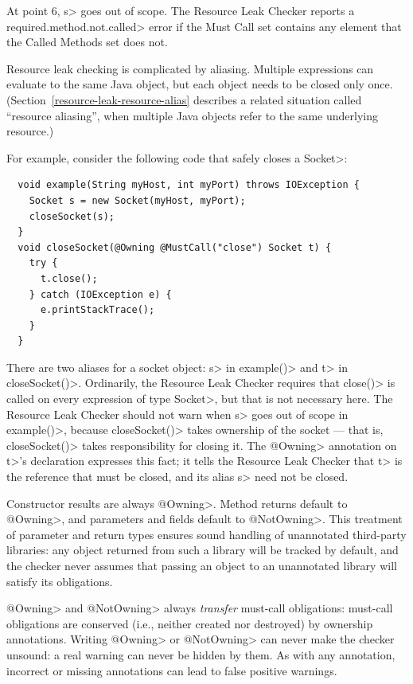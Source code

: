 At point 6, \<s> goes out of scope.  The Resource Leak Checker reports a
\<required.method.not.called> error if the Must Call set contains any
element that the Called Methods set does not.



Resource leak checking is complicated by aliasing.  Multiple expressions
can evaluate to the same Java object, but each object needs to be
closed only once.  (Section~\ref{resource-leak-resource-alias} describes a
related situation called ``resource aliasing'', when multiple Java objects
refer to the same underlying resource.)

For example, consider the following code that safely closes a \<Socket>:

\begin{verbatim}
  void example(String myHost, int myPort) throws IOException {
    Socket s = new Socket(myHost, myPort);
    closeSocket(s);
  }
  void closeSocket(@Owning @MustCall("close") Socket t) {
    try {
      t.close();
    } catch (IOException e) {
      e.printStackTrace();
    }
  }
\end{verbatim}

There are two aliases for a socket object: \<s> in \<example()> and \<t> in
\<closeSocket()>.  Ordinarily, the Resource Leak Checker requires that
\<close()> is called on every expression of type \<Socket>, but that is not
necessary here.  The Resource Leak Checker should not warn when
\<s> goes out of scope in \<example()>, because \<closeSocket()> takes ownership
of the socket --- that is, \<closeSocket()> takes responsibility for closing
it. The \<@Owning> annotation on \<t>'s declaration expresses this fact; it
tells the Resource Leak Checker that \<t> is the reference that must be
closed, and its alias \<s> need not be closed.

Constructor results are always \<@Owning>.
Method returns default to \<@Owning>,
and parameters and fields default to \<@NotOwning>. This treatment of parameter and
return types ensures sound handling of unannotated third-party libraries: any
object returned from such a library will be tracked by default, and the checker
never assumes that passing an object to an unannotated library will satisfy its obligations.

\<@Owning> and \<@NotOwning> always \emph{transfer} must-call obligations: must-call
obligations are conserved (i.e., neither created nor destroyed) by ownership annotations.
Writing \<@Owning> or \<@NotOwning> can never make the checker
unsound:  a real warning can never be hidden by them.
As with any annotation, incorrect or missing annotations can lead to false positive warnings.

